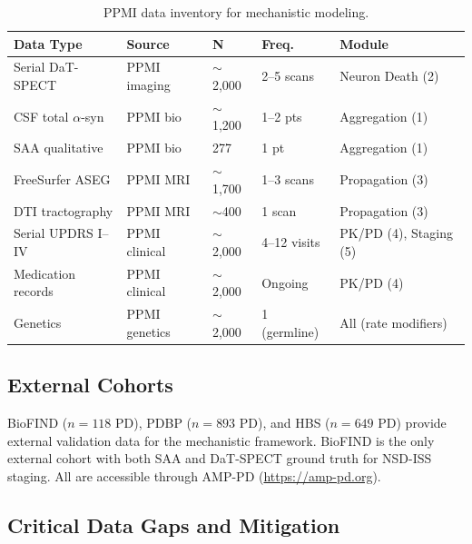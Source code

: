 \begin{table}[h]
\centering
\caption{PPMI data inventory for mechanistic modeling.}
\label{tab:data-inventory}
\small
\begin{tabular}{p{3.5cm}p{2cm}p{1.5cm}p{2cm}p{3cm}}
\toprule
\textbf{Data Type} & \textbf{Source} & \textbf{N} & \textbf{Freq.} & \textbf{Module} \\
\midrule
Serial DaT-SPECT & PPMI imaging & $\sim$2,000 & 2--5 scans & Neuron Death (2) \\
CSF total $\alpha$-syn & PPMI bio & $\sim$1,200 & 1--2 pts & Aggregation (1) \\
SAA qualitative & PPMI bio & 277 & 1 pt & Aggregation (1) \\
FreeSurfer ASEG & PPMI MRI & $\sim$1,700 & 1--3 scans & Propagation (3) \\
DTI tractography & PPMI MRI & $\sim$400 & 1 scan & Propagation (3) \\
Serial UPDRS I--IV & PPMI clinical & $\sim$2,000 & 4--12 visits & PK/PD (4), Staging (5) \\
Medication records & PPMI clinical & $\sim$2,000 & Ongoing & PK/PD (4) \\
Genetics & PPMI genetics & $\sim$2,000 & 1 (germline) & All (rate modifiers) \\
\bottomrule
\end{tabular}
\end{table}

\subsection{External Cohorts}

BioFIND ($n = 118$ PD), PDBP ($n = 893$ PD), and HBS ($n = 649$ PD) provide external validation data for the mechanistic framework. BioFIND is the only external cohort with both SAA and DaT-SPECT ground truth for NSD-ISS staging. All are accessible through AMP-PD (\url{https://amp-pd.org}).

\subsection{Critical Data Gaps and Mitigation}

